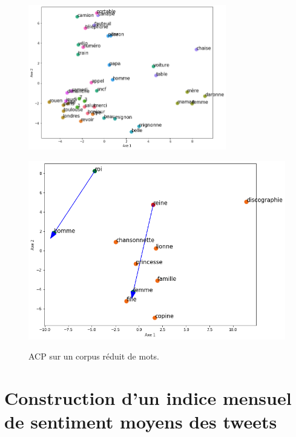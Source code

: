 \documentclass[10pt,french,french]{article}
\begin{document}
\begin{figure}[h]
\begin{minipage}{.5\textwidth}
\centering
\includegraphics[width=0.77\textwidth]{img/acp_gensim.png}
\captionsetup{margin=0cm,format=hang,justification=justified}
\caption{ACP sur un corpus réduit de mots.}\label{fig:acp_gensim}
\end{minipage}%
\begin{minipage}{.5\textwidth}
   \centering
  \includegraphics[width=0.8\linewidth]{img/acp_reine.png}
  \label{fig:acp_reine}
\end{minipage}%
\end{figure}

\newpage

\section{Construction d'un indice mensuel de sentiment moyens des
tweets}\label{sec:sentimentalAnalysis}
\end{document}
